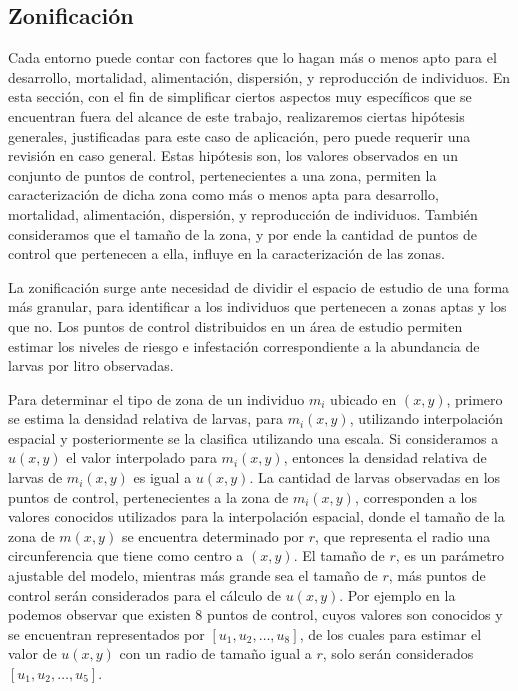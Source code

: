 \subsection{Zonificación}
\label{subsec:cap4-zonificacion}
Cada entorno puede contar con factores que lo hagan más o menos apto para el desarrollo,
mortalidad, alimentación, dispersión, y reproducción de individuos. En esta sección, con el fin de
simplificar ciertos aspectos muy específicos que se encuentran fuera del alcance de este trabajo,
realizaremos ciertas hipótesis generales, justificadas para este caso de aplicación, pero puede
requerir una revisión en caso general. Estas hipótesis son, los valores observados en un
conjunto de puntos de control, pertenecientes a una zona, permiten la caracterización de dicha
zona como más o menos apta para desarrollo, mortalidad, alimentación, dispersión, y reproducción de
individuos. También consideramos que el tamaño de la zona, y por ende la cantidad de puntos de
control que pertenecen a ella, influye en la caracterización de las zonas.

La zonificación surge ante necesidad de dividir el espacio de estudio de una forma más granular,
para identificar a los individuos que pertenecen a zonas aptas y los que no. Los puntos de control
distribuidos en un área de estudio permiten estimar los niveles de riesgo e infestación
correspondiente a la abundancia de larvas por litro observadas.

Para determinar el tipo de zona de un individuo $m_{i}$ ubicado en $(x,y)$, primero se estima la
densidad relativa de larvas, para $m_{i}(x,y)$, utilizando interpolación espacial y posteriormente
se la clasifica utilizando una escala. Si consideramos a $u(x,y)$ el valor interpolado para
$m_{i}(x,y)$, entonces la densidad relativa de larvas de $m_{i}(x,y)$ es igual a $u(x,y)$. La
cantidad de larvas observadas en los puntos de control, pertenecientes a la zona de $m_{i}(x,y)$,
corresponden a los valores conocidos utilizados para la interpolación espacial, donde el tamaño de
la zona de $m(x,y)$ se encuentra determinado por $r$, que representa el radio una circunferencia
que tiene como centro a $(x,y)$. El tamaño de $r$, es un parámetro ajustable del modelo, mientras
más grande sea el tamaño de $r$, más puntos de control serán considerados para el cálculo de
$u(x,y)$. Por ejemplo en la  podemos observar que existen 8 puntos
de control, cuyos valores son conocidos y se encuentran representados por
$[u_{1}, u_{2}, \dots ,u_{8}]$, de los cuales para estimar el valor de $u(x,y)$ con un radio de
tamaño igual a $r$, solo serán considerados $[u_{1}, u_{2},\dots,u_{5}]$.

